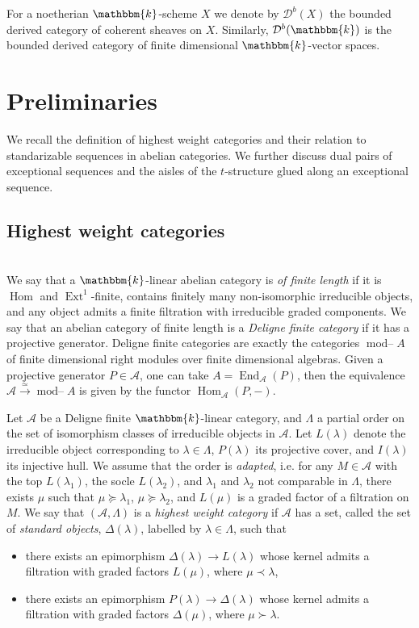 \documentclass[12pt,a4paper]{amsart}
\newcommand{\aA}{{\mathcal{A}}}
\newcommand{\dD}{{\mathcal{D}}}
\newcommand{\la}{\lambda}
\newcommand{\kk}{\mathbbm{k}}
\newcommand{\tr}{{\mbox{$t$-struc}\-tu\-r}}
\newcommand{\Hom}{\mathop{\textrm{Hom}}\nolimits}
\newcommand{\Ext}{\mathop{\operatorname{Ext}}\nolimits}
\newcommand{\End}{\mathop{\textrm{End}}\nolimits}
\newcommand{\modu}{\mathop{\textrm{mod--}}}
\theoremstyle{definition}
\begin{document}
For a noetherian $\kk$-scheme $X$ we denote by $\dD^b(X)$ the bounded derived category of coherent sheaves on $X$. Similarly, $\dD^b(\kk)$ is the bounded derived category of finite dimensional $\kk$-vector spaces.

\section{Preliminaries}

We recall the definition of highest weight categories and their relation to standarizable sequences in abelian categories. We further discuss dual pairs of exceptional sequences and the aisles of the \tr e glued along an exceptional sequence. 

\vspace{0.3cm}
\subsection{Highest weight categories}\label{ssec_hwc}~\\

 We say that a $\kk$-linear abelian category is \emph{of finite length} if it is $\Hom$ and $\Ext^1$-finite, contains finitely many non-isomorphic irreducible objects, and any object admits a finite filtration with irreducible graded components. We say that an abelian category of finite length is a \emph{Deligne finite category} if it has a projective generator. Deligne finite categories are exactly the categories $\modu A$ of finite dimensional right modules over finite dimensional algebras. Given a projective generator $P \in \aA$, one can take $A= \End_{\aA}(P)$, then the equivalence $\aA \xrightarrow{\simeq} \modu A$ is given by the functor $\Hom_{\aA}(P, -)$.


Let $\aA$ be a Deligne finite $\kk$-linear category, and $\Lambda$ a partial order on the set of  isomorphism classes of irreducible objects in $\aA$. Let $L(\la)$ denote the irreducible object corresponding to $\la \in \Lambda$, $P(\la)$ its projective cover, and $I(\la)$ its injective hull. We assume that the order is \emph{adapted}, i.e. for any $M \in \aA$ with the top $L(\la_1)$, the socle $L(\la_2)$, and $\la_1$ and $\la_2$ not comparable in $\Lambda$, there exists $\mu $ such that  $\mu\succeq \la_1$,  $\mu \succeq \la_2$, and $L(\mu)$ is a graded factor of a filtration on $M$. We say that $(\aA, \Lambda)$ is a  \emph{highest weight category} \cite{CPS} if $\aA$ has a set, called the set of \emph{standard objects}, $\Delta(\la)$, labelled by $\la \in \Lambda$, such that 
\begin{itemize}
	\item[(st1)] there exists an epimorphism $\Delta(\la) \to L(\la)$
	whose kernel admits a filtration with graded factors $L(\mu)$, where $\mu \prec \la$,
	\item[(st2)] there exists an epimorphism $P(\la) \to \Delta(\la)$
	whose kernel admits a filtration with graded factors $\Delta(\mu)$, where $\mu \succ\la$.
\end{itemize} 
\end{document}
